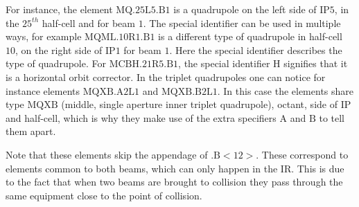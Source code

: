 For instance, the element $\mathrm{MQ.25L5.B1}$ is a quadrupole on the left side of $\mathrm{IP5}$, in the $25^{th}$ half-cell and for beam $1$.
The special identifier can be used in multiple ways, for example $\mathrm{MQML.10R1.B1}$ is a different type of quadrupole in half-cell $10$, on the right side of $\mathrm{IP1}$ for beam $1$.
Here the special identifier describes the type of quadrupole.
For $\mathrm{MCBH.21R5.B1}$, the special identifier $\mathrm{H}$ signifies that it is a horizontal orbit corrector.
In the triplet quadrupoles one can notice for instance elements $\mathrm{MQXB.A2L1}$ and $\mathrm{MQXB.B2L1}$.
In this case the elements share type $\mathrm{MQXB}$ (middle, single aperture inner triplet quadrupole), octant, side of $\mathrm{IP}$ and half-cell, which is why they make use of the extra specifiers $\mathrm{A}$ and $\mathrm{B}$ to tell them apart.

Note that these elements skip the appendage of $\mathrm{.B<12>}$.
These correspond to elements common to both beams, which can only happen in the $\mathrm{IR}$.
This is due to the fact that when two beams are brought to collision they pass through the same equipment close to the point of collision.

